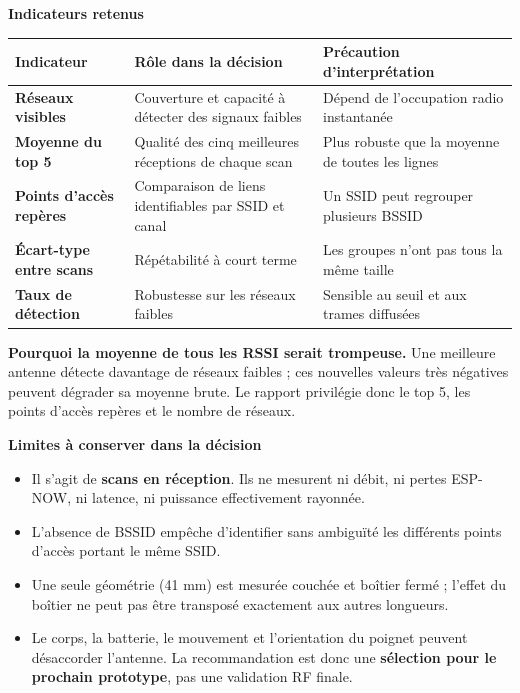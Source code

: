 \documentclass[10pt,a4paper]{article}
\begin{document}
\vspace{2mm}
\textbf{Indicateurs retenus}\par\smallskip
\begin{tabularx}{\textwidth}{>{\bfseries\color{navy}}p{31mm} Y p{43mm}}
\toprule
Indicateur & Rôle dans la décision & Précaution d'interprétation \\
\midrule
Réseaux visibles & Couverture et capacité à détecter des signaux faibles & Dépend de l'occupation radio instantanée \\
Moyenne du top 5 & Qualité des cinq meilleures réceptions de chaque scan & Plus robuste que la moyenne de toutes les lignes \\
Points d'accès repères & Comparaison de liens identifiables par SSID et canal & Un SSID peut regrouper plusieurs BSSID \\
Écart-type entre scans & Répétabilité à court terme & Les groupes n'ont pas tous la même taille \\
Taux de détection & Robustesse sur les réseaux faibles & Sensible au seuil et aux trames diffusées \\
\bottomrule
\end{tabularx}

\vspace{5mm}
\begin{warningbox}
\textbf{Pourquoi la moyenne de tous les RSSI serait trompeuse.} Une meilleure antenne détecte davantage de réseaux faibles ; ces nouvelles valeurs très négatives peuvent dégrader sa moyenne brute. Le rapport privilégie donc le top 5, les points d'accès repères et le nombre de réseaux.
\end{warningbox}

\vspace{3mm}
\textbf{Limites à conserver dans la décision}
\begin{itemize}
  \item Il s'agit de \textbf{scans en réception}. Ils ne mesurent ni débit, ni pertes ESP-NOW, ni latence, ni puissance effectivement rayonnée.
  \item L'absence de BSSID empêche d'identifier sans ambiguïté les différents points d'accès portant le même SSID.
  \item Une seule géométrie (41 mm) est mesurée couchée et boîtier fermé ; l'effet du boîtier ne peut pas être transposé exactement aux autres longueurs.
  \item Le corps, la batterie, le mouvement et l'orientation du poignet peuvent désaccorder l'antenne. La recommandation est donc une \textbf{sélection pour le prochain prototype}, pas une validation RF finale.
\end{itemize}
\end{document}
